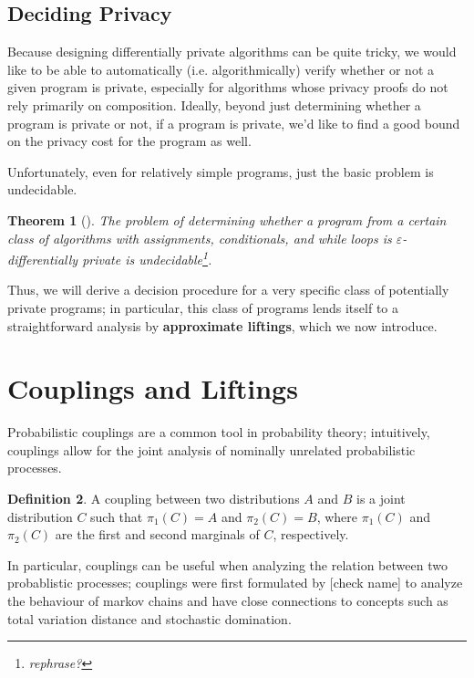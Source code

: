 \documentclass[12pt]{article}
\newtheorem{thm}{Theorem}[section]
\theoremstyle{definition}
\newtheorem{defn}[thm]{Definition}
\begin{document}
\subsection{Deciding Privacy}

Because designing differentially private algorithms can be quite tricky, we would like to be able to automatically (i.e. algorithmically) verify whether or not a given program is private, especially for algorithms whose privacy proofs do not rely primarily on composition. 
Ideally, beyond just determining whether a program is private or not, if a program is private, we'd like to find a good bound on the privacy cost for the program as well. 

Unfortunately, even for relatively simple programs, just the basic problem is undecidable. 

\begin{thm}[\cite{barthe.etal2020decidingdp}]
    The problem of determining whether a program from a certain class of algorithms with assignments, conditionals, and while loops is $\varepsilon$-differentially private is undecidable\footnote{rephrase?}.
\end{thm}

Thus, we will derive a decision procedure for a very specific class of potentially private programs; in particular, this class of programs lends itself to a straightforward analysis by \textbf{approximate liftings}, which we now introduce. 

\section{Couplings and Liftings}

Probabilistic couplings are a common tool in probability theory; intuitively, couplings allow for the joint analysis of nominally unrelated probabilistic processes. 

\begin{defn}
    A coupling between two distributions $A$ and $B$ is a joint distribution $C$ such that $\pi_1(C)=A$ and $\pi_2(C)=B$, where $\pi_1(C)$ and $\pi_2(C)$ are the first and second marginals of $C$, respectively. 
\end{defn}

In particular, couplings can be useful when analyzing the relation between two probablistic processes; couplings were first formulated by [check name] to analyze the behaviour of markov chains and have close connections to concepts such as total variation distance and stochastic domination. 
\end{document}
